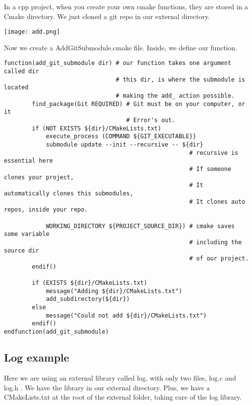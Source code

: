 In a cpp project, when you create your own cmake functions, they are stored in a Cmake directory. We just cloned a 
git repo in our external directory.

\begin{center}
    \texttt{[image: add.png]}
\end{center}

Now we create a AddGitSubmodule.cmake file. Inside, we define our function.

\begin{verbatim}
function(add_git_submodule dir) # our function takes one argument called dir
                                # this dir, is where the submodule is located
                                # making the add_ action possible.
        find_package(Git REQUIRED) # Git must be on your computer, or it
                                   # Error's out.
        if (NOT EXISTS ${dir}/CMakeLists.txt)
            execute_process (COMMAND ${GIT_EXECUTABLE}}
            submodule update --init --recursive -- ${dir}
                                                     # recursive is essential here
                                                     # If someone clones your project, 
                                                     # It automatically clones this submodules,
                                                     # It clones auto repos, inside your repo.
                                                            
            WORKING_DIRECTORY ${PROJECT_SOURCE_DIR}) # cmake saves some variable
                                                     # including the source dir
                                                     # of our project.
        endif()
        
        if (EXISTS ${dir}/CMakeLists.txt)
            message("Adding ${dir}/CMakeLists.txt")
            add_subdirectory(${dir})
        else
            message("Could not add ${dir}/CMakeLists.txt")
        endif()
endfunction(add_git_submodule)
\end{verbatim}


\subsection{Log example}

Here we are using an external library called log, with only two files, log.c and log.h . We have the library in our 
external directory. Plus, we have a CMakeLists.txt at the root of the external folder, taking care of the log library. 


